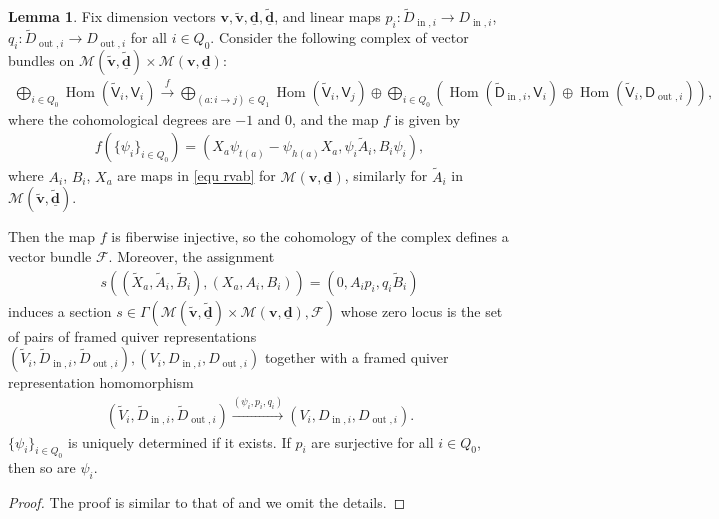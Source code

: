 \documentclass[10pt]{amsart}
\theoremstyle{definition}
\newtheorem{Lemma}[Theorem]{Lemma}
\numberwithin{equation}{section}
\newcommand{\bv}{\mathbf{v}}
\newcommand{\bd}{\mathbf{d}}
\newcommand{\cM}{\mathcal{M}}
\newcommand{\Hom}{\operatorname{Hom}}
\newcommand{\In}{\operatorname{in}}
\newcommand{\Out}{\operatorname{out}}
\begin{document}
\begin{Lemma}\label{lem locus of quiver rep hom}
Fix dimension vectors $\bv,\widetilde{\bv},\underline{\bd},\underline{\widetilde{\bd}}$, and  linear maps $p_i\colon \widetilde{D}_{\In,i}\to {D}_{\In,i}$, $q_i\colon \widetilde{D}_{\Out,i}\to {D}_{\Out,i}$ for all $i\in Q_0$. Consider the following complex of vector bundles on $\cM(\widetilde{\bv},\underline{\widetilde{\bd}})\times \cM(\bv,\underline{\bd})$:
\begin{align*}
    \bigoplus_{i\in Q_0}\Hom(\widetilde{\mathsf V}_i,\mathsf V_i)\xrightarrow{f} \bigoplus_{(a\colon i\to j)\in Q_1}\Hom(\widetilde{\mathsf V}_i,\mathsf V_j)\oplus\bigoplus_{i\in Q_0}\left(\Hom(\widetilde{\mathsf D}_{\In,i},\mathsf V_i)\oplus\Hom(\widetilde{\mathsf V}_i,\mathsf D_{\Out,i})\right),
\end{align*}
where the cohomological degrees are $-1$ and $0$, and the map $f$ is given by
\begin{align*}
    f(\{\psi_i\}_{i\in Q_0})=(X_a\psi_{t(a)}-\psi_{h(a)}X_a,\psi_i\widetilde{A}_i,B_i\psi_i),
\end{align*}
where $A_i$, $B_i$, $X_a$ are maps in \eqref{equ rvab} for $\cM(\bv,\underline{\bd})$, similarly for $\widetilde{A}_i$ in $\cM(\widetilde{\bv},\underline{\widetilde{\bd}})$. 

Then the map $f$ is fiberwise injective, so the cohomology of the complex defines a vector bundle $\mathcal F$. Moreover, the assignment
\begin{align}\label{eq section for quiver rep hom}
    s\left((\widetilde{X}_a,\widetilde{A}_i,\widetilde{B}_i),(X_a,A_i,B_i)\right)=(0,A_ip_i,q_i\widetilde{B}_i)
\end{align}
induces a section $s\in \Gamma(\cM(\widetilde{\bv},\underline{\widetilde{\bd}})\times \cM(\bv,\underline{\bd}),\mathcal F)$ whose zero locus is the set of pairs of framed quiver representations $(\widetilde{V}_i,\widetilde{D}_{\In,i},\widetilde{D}_{\Out,i}),(V_i,D_{\In,i},D_{\Out,i})$ together with a framed quiver representation homomorphism 
\begin{align*}
(\widetilde{V}_i,\widetilde{D}_{\In,i},\widetilde{D}_{\Out,i})\xrightarrow{(\psi_i,p_i,q_i)} (V_i,D_{\In,i},D_{\Out,i}).
\end{align*}
$\{\psi_i\}_{i\in Q_0}$ is uniquely determined if it exists. If $p_i$ are surjective for all $i\in Q_0$, then so are $\psi_i$.
\end{Lemma}
\begin{proof}
The proof is similar to that of \cite[Prop.~2.19]{N2} and we omit the details.
\end{proof}
\end{document}
